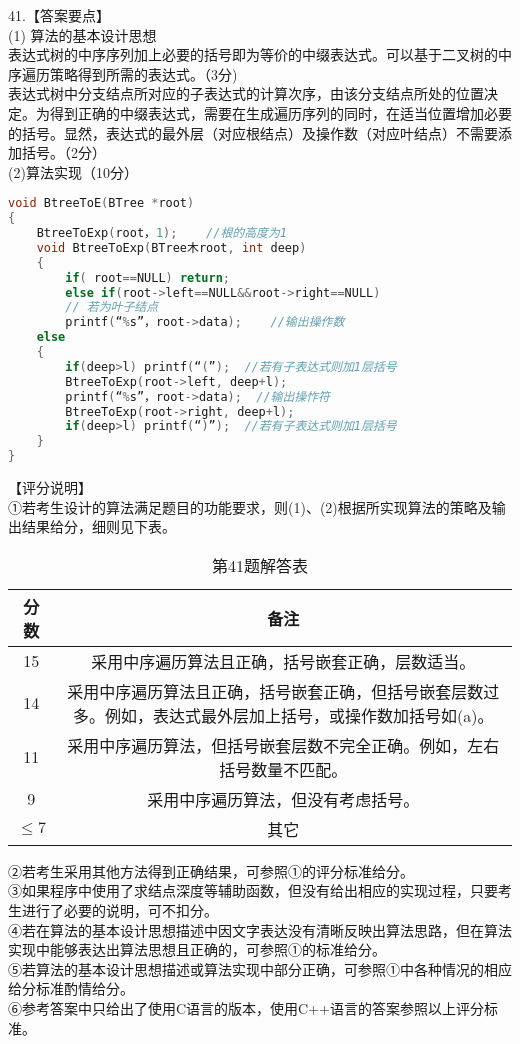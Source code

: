 41.【答案要点】 \\
(1) 算法的基本设计思想 \\
表达式树的中序序列加上必要的括号即为等价的中缀表达式。可以基于二叉树的中序遍历策略得到所需的表达式。（3分) \\
表达式树中分支结点所对应的子表达式的计算次序，由该分支结点所处的位置决定。为得到正确的中缀表达式，需要在生成遍历序列的同时，在适当位置增加必要的括号。显然，表达式的最外层（对应根结点）及操作数（对应叶结点）不需要添加括号。（2分） \\
(2)算法实现（10分） \\
\begin{lstlisting}[language=cpp]
void BtreeToE(BTree *root)
{
    BtreeToExp(root，1);    //根的高度为1
    void BtreeToExp(BTree木root, int deep)
    {
        if( root==NULL) return;
        else if(root->left==NULL&&root->right==NULL)
        // 若为叶子结点
        printf(“%s”，root->data);    //输出操作数
    else
    {
        if(deep>l) printf(“(”);  //若有子表达式则加1层括号
        BtreeToExp(root->left, deep+l);
        printf(“%s”，root->data);  //输出操怍符
        BtreeToExp(root->right, deep+l);
        if(deep>l) printf(“)”);  //若有子表达式则加1层括号
    }
}
\end{lstlisting}
【评分说明】 \\
①若考生设计的算法满足题目的功能要求，则(1)、(2)根据所实现算法的策略及输出结果给分，细则见下表。
\begin{table}[ht]
\centering
\caption{第41题解答表}\label{tab_CSN17_3}
\begin{tabular}{|c|c|}
\hline
分数 & 备注 \\
\hline
15 & 采用中序遍历算法且正确，括号嵌套正确，层数适当。 \\
\hline
14 & 采用中序遍历算法且正确，括号嵌套正确，但括号嵌套层数过多。例如，表达式最外层加上括号，或操作数加括号如(a)。 \\
\hline
11 & 采用中序遍历算法，但括号嵌套层数不完全正确。例如，左右括号数量不匹配。 \\
\hline
9 & 采用中序遍历算法，但没有考虑括号。 \\
\hline
$\leqslant7$ & 其它 \\
\hline
\end{tabular}
\end{table}
②若考生采用其他方法得到正确结果，可参照①的评分标准给分。 \\
③如果程序中使用了求结点深度等辅助函数，但没有给出相应的实现过程，只要考生进行了必要的说明，可不扣分。 \\
④若在算法的基本设计思想描述中因文字表达没有清晰反映出算法思路，但在算法实现中能够表达出算法思想且正确的，可参照①的标准给分。 \\
⑤若算法的基本设计思想描述或算法实现中部分正确，可参照①中各种情况的相应给分标准酌情给分。 \\
⑥参考答案中只给出了使用C语言的版本，使用C++语言的答案参照以上评分标准。

